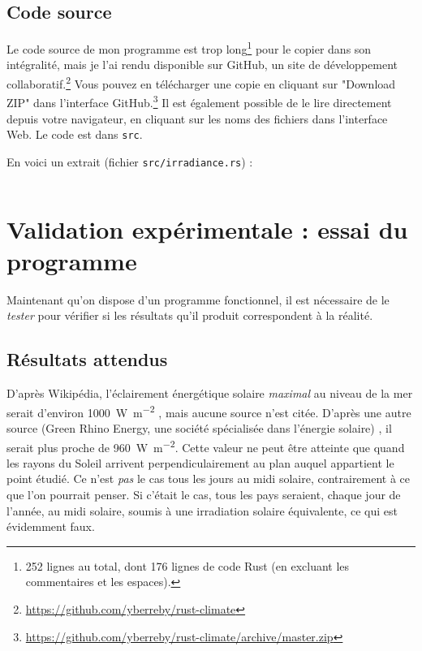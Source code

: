 \documentclass[12pt]{article}
\begin{document}
\FloatBarrier
\subsection{Code source}

Le code source de mon programme est trop long\footnote{252 lignes au total, dont 176 lignes de code Rust (en excluant les commentaires et les espaces).} pour le copier dans son intégralité, mais je l'ai rendu disponible sur GitHub, un site de développement collaboratif.\footnote{\url{https://github.com/yberreby/rust-climate}}
Vous pouvez en télécharger une copie en cliquant sur "Download ZIP" dans l'interface GitHub.\footnote{\url{https://github.com/yberreby/rust-climate/archive/master.zip}}
Il est également possible de le lire directement depuis votre navigateur, en cliquant sur les noms des fichiers dans l'interface Web.
Le code est dans \texttt{src}.

En voici un extrait (fichier \texttt{src/irradiance.rs}) :

\inputminted[linenos]{rust}{rust-climate/src/irradiance.rs}



\clearpage
\section{Validation expérimentale : essai du programme}

Maintenant qu'on dispose d'un programme fonctionnel, il est nécessaire de le \emph{tester} pour vérifier si les résultats qu'il produit correspondent à la réalité.

\subsection{Résultats attendus}

D'après Wikipédia, l'éclairement énergétique solaire \emph{maximal} au niveau de la mer serait d'environ \SI{1000}{\watt\per\square\meter} \cite{earth_irradiance_wiki}, mais aucune source n'est citée.
D'après une autre source (Green Rhino Energy, une société spécialisée dans l'énergie solaire) \cite{green_rhino_irradiance}, il serait plus proche de \SI{960}{\watt\per\square\meter}.
Cette valeur ne peut être atteinte que quand les rayons du Soleil arrivent perpendiculairement au plan auquel appartient le point étudié.
Ce n'est \emph{pas} le cas tous les jours au midi solaire, contrairement à ce que l'on pourrait penser.
Si c'était le cas, tous les pays seraient, chaque jour de l'année, au midi solaire, soumis à une irradiation solaire équivalente, ce qui est évidemment faux.
\end{document}
